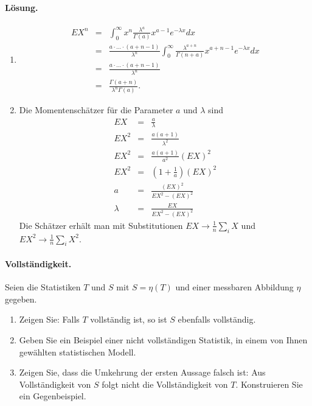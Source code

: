 \paragraph*{Lösung.}
\begin{enumerate}

    \item \begin{eqnarray*}
            E X^n &=& \int_{0}^{\infty} x^n \frac{\lambda^a}{\Gamma(a)}x^{a-1}e^{-\lambda x} dx \\
            &=& \frac{a \cdot\ldots\cdot \left( a+n-1 \right)}{\lambda^n} 
            \int_{0}^{\infty} \frac{\lambda^{a+n}}{\Gamma(n+a)} x^{a+n-1} e^{-\lambda x} dx \\
            &=& \frac{a\cdot \ldots \cdot \left( a+n-1 \right)}{\lambda^n} \\
            &=& \frac{\Gamma\left( a+n \right)}{ \lambda^n \Gamma\left( a \right)}.
        \end{eqnarray*}

    \item Die Momentenschätzer für die Parameter $a$ und $\lambda$ sind
        \begin{eqnarray*}
            E X &=& \frac{a}{\lambda} \\
            E X^2 &=&  \frac{a(a+1)}{\lambda^2} \\
            E X^2 &=&  \frac{a(a+1)}{a^2} \left( E X \right)^2 \\
            E X^2 &=& \left( 1 + \frac{1}{a} \right) \left( E X \right)^2 \\
            a &=& \frac{ \left( E X \right)^2 }{ E X^2 - \left( E X \right)^2}  \\
            \lambda &=&  \frac{ EX }{ E X^2 - \left( E X \right)^2} 
        \end{eqnarray*}
        Die Schätzer erhält man mit Substitutionen $EX \to \frac{1}{n} \sum_{i}^{} X$ und 
        $E X^2 \to \frac{1}{n} \sum_{i}^{} X^2$.


\end{enumerate}



\paragraph{Vollständigkeit.} Seien die Statistiken $T$ und $S$ mit $S=\eta(T)$ und einer messbaren 
Abbildung $\eta$ gegeben. 
\begin{enumerate}
    \item Zeigen Sie: Falls $T$ vollständig ist, so ist $S$ ebenfalls vollständig.
    \item Geben Sie ein Beispiel einer nicht vollständigen Statistik, in einem von Ihnen
        gewählten statistischen Modell.
    \item Zeigen Sie, dass die Umkehrung der ersten Aussage falsch ist: Aus Vollständigkeit von $S$ 
        folgt nicht die Vollständigkeit von $T$. Konstruieren Sie ein Gegenbeispiel.
\end{enumerate}


